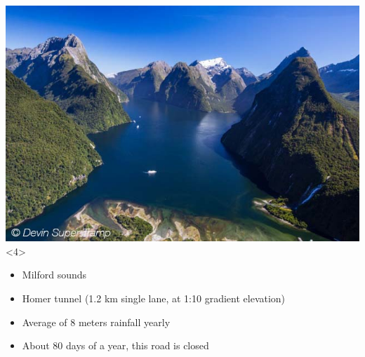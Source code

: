 \documentclass[12pt]{beamer}
\begin{document}
\begin{frame}
\begin{center}
                    \includegraphics[height=0.5\textheight]{images/milford-sounds.jpg}<4>
                \end{center}
            
                \begin{itemize}
                    \item Milford sounds
                    \pause
                    \item Homer tunnel (1.2 km single lane, at 1:10 gradient elevation)
                    \pause
                    \item Average of 8 meters rainfall yearly
                    \pause
                    \item About 80 days of a year, this road is closed
                \end{itemize}
        \end{frame}
\end{document}

